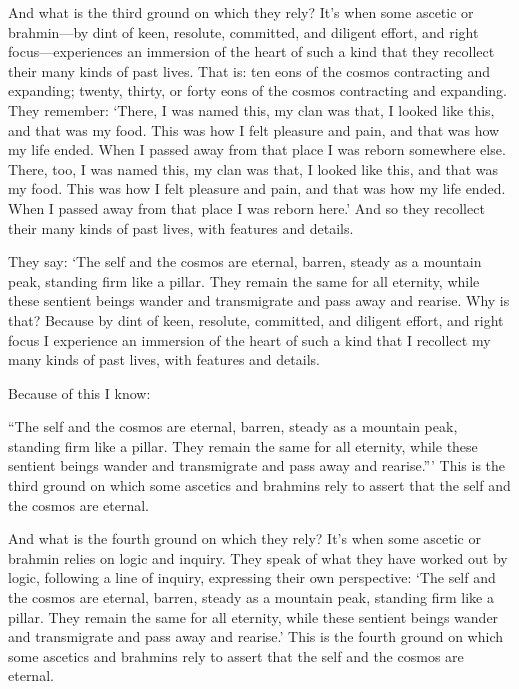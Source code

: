 \documentclass[12pt,openany]{book}%
\begin{document}
And what is the third ground on which they rely? It’s when some ascetic or brahmin—by dint of keen, resolute, committed, and diligent effort, and right focus—experiences an immersion of the heart of such a kind that they recollect their many kinds of past lives. That is: ten eons of the cosmos contracting and expanding; twenty, thirty, or forty eons of the cosmos contracting and expanding. They remember: ‘There, I was named this, my clan was that, I looked like this, and that was my food. This was how I felt pleasure and pain, and that was how my life ended. When I passed away from that place I was reborn somewhere else. There, too, I was named this, my clan was that, I looked like this, and that was my food. This was how I felt pleasure and pain, and that was how my life ended. When I passed away from that place I was reborn here.’ And so they recollect their many kinds of past lives, with features and details. 

They say: ‘The self and the cosmos are eternal, barren, steady as a mountain peak, standing firm like a pillar. They remain the same for all eternity, while these sentient beings wander and transmigrate and pass away and rearise. Why is that? Because by dint of keen, resolute, committed, and diligent effort, and right focus I experience an immersion of the heart of such a kind that I recollect my many kinds of past lives, with features and details. 

Because of this I know: 

“The self and the cosmos are eternal, barren, steady as a mountain peak, standing firm like a pillar. They remain the same for all eternity, while these sentient beings wander and transmigrate and pass away and rearise.”’ This is the third ground on which some ascetics and brahmins rely to assert that the self and the cosmos are eternal. 

And what is the fourth ground on which they rely? It’s when some ascetic or brahmin relies on logic and inquiry. They speak of what they have worked out by logic, following a line of inquiry, expressing their own perspective: ‘The self and the cosmos are eternal, barren, steady as a mountain peak, standing firm like a pillar. They remain the same for all eternity, while these sentient beings wander and transmigrate and pass away and rearise.’ This is the fourth ground on which some ascetics and brahmins rely to assert that the self and the cosmos are eternal. 
\end{document}

